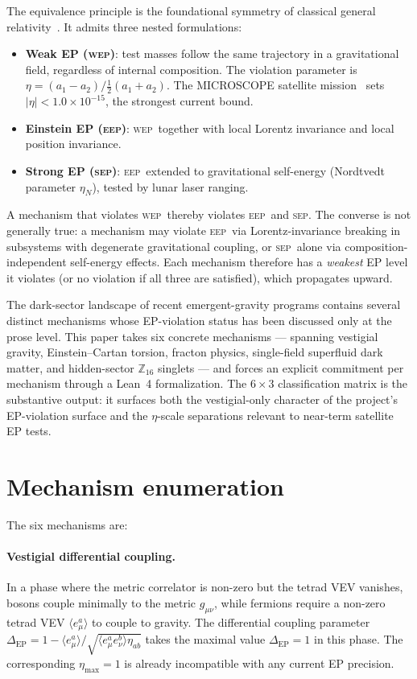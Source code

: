 \documentclass[twocolumn]{revtex4-2}
\newcommand{\WEP}{\textsc{wep}}
\newcommand{\EEP}{\textsc{eep}}
\newcommand{\SEP}{\textsc{sep}}
\begin{document}
The equivalence principle is the foundational symmetry of classical
general relativity~\cite{Will2018}. It admits three nested formulations:

\begin{itemize}
\item \textbf{Weak EP (\WEP)}: test masses follow the same trajectory in
a gravitational field, regardless of internal composition. The
violation parameter is $\eta = (a_1 - a_2)/\frac{1}{2}(a_1 + a_2)$. The
MICROSCOPE satellite mission~\cite{Touboul2017} sets
$|\eta| < 1.0 \times 10^{-15}$, the strongest current bound.
\item \textbf{Einstein EP (\EEP)}: \WEP\ together with local Lorentz
invariance and local position invariance.
\item \textbf{Strong EP (\SEP)}: \EEP\ extended to gravitational
self-energy (Nordtvedt parameter $\eta_N$), tested by lunar laser
ranging.
\end{itemize}

A mechanism that violates \WEP\ thereby violates \EEP\ and \SEP. The
converse is not generally true: a mechanism may violate \EEP\ via
Lorentz-invariance breaking in subsystems with degenerate
gravitational coupling, or \SEP\ alone via composition-independent
self-energy effects. Each mechanism therefore has a \emph{weakest}
EP level it violates (or no violation if all three are satisfied),
which propagates upward.

The dark-sector landscape of recent emergent-gravity programs contains
several distinct mechanisms whose EP-violation status has been
discussed only at the prose level. This paper takes six concrete
mechanisms --- spanning vestigial gravity, Einstein--Cartan torsion,
fracton physics, single-field superfluid dark matter, and
hidden-sector $\mathbb{Z}_{16}$ singlets --- and forces an explicit
commitment per mechanism through a Lean~4 formalization. The
$6\times 3$ classification matrix is the substantive output: it
surfaces both the vestigial-only character of the project's
EP-violation surface and the $\eta$-scale separations relevant to
near-term satellite EP tests.

\section{Mechanism enumeration}
\label{sec:enum}

The six mechanisms are:

\paragraph*{Vestigial differential coupling.}
In a phase where the metric correlator is non-zero but the tetrad VEV
vanishes, bosons couple minimally to the metric $g_{\mu\nu}$, while
fermions require a non-zero tetrad VEV $\langle e^a_\mu \rangle$ to
couple to gravity. The differential coupling parameter
$\Delta_{\mathrm{EP}} = 1 - \langle e^a_\mu \rangle / \sqrt{\langle
e^a_\mu e^b_\nu\rangle \eta_{ab}}$ takes the maximal value
$\Delta_{\mathrm{EP}} = 1$ in this phase. The corresponding
$\eta_{\max} = 1$ is already incompatible with any current EP precision.
\end{document}

